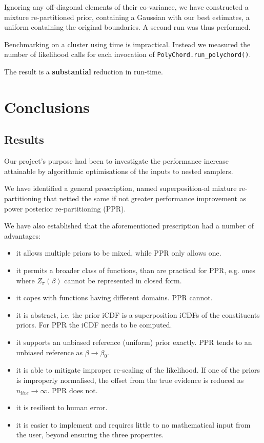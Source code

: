 \documentclass[usenatbib]{mnras}
\begin{document}
Ignoring any off-diagonal elements of their co-variance, we have
constructed a mixture re-partitioned prior, containing a Gaussian
with our best estimates, a uniform containing the original
boundaries. A second run was thus performed.

Benchmarking on a cluster using time is impractical. Instead we
measured the number of likelihood calls for each invocation of
\texttt{PolyChord.run\_polychord()}.

The result is a \textbf{substantial} reduction in run-time. 




\section{Conclusions}
\label{sec:orgaf00819}

\subsection{Results}
\label{sec:org6b6bf5c}
Our project's purpose had been to investigate the performance
increase attainable by algorithmic optimisations of the inputs to
nested samplers. 

We have identified a general prescription, named superposition-al
mixture re-partitioning that netted the same if not greater
performance improvement as power posterior re-partitioning (PPR). 

We have also established that the aforementioned prescription had a
number of advantages:
\begin{itemize}
\item it allows multiple priors to be mixed, while PPR only allows one.
\item it permits a broader class of functions, than are practical for
PPR, e.g. ones where \(Z_{\pi}(\beta)\) cannot be represented in
closed form.
\item it copes with functions having different domains. PPR cannot.
\item it is abstract, i.e. the prior iCDF is a superposition iCDFs of
the constituents priors. For PPR the iCDF needs to be computed.
\item it supports an unbiased reference (uniform) prior exactly. PPR
tends to an unbiased reference as \(\beta\rightarrow\beta_{0}\).
\item it is able to mitigate improper re-scaling of the
likelihood. If one of the priors is improperly normalised, the
offset from the true evidence is reduced as
\(n_{live}\rightarrow\infty\). PPR does not.
\item it is resilient to human error.
\item it is easier to implement and requires little to no mathematical
input from the user, beyond ensuring the three properties.
\end{itemize}
\end{document}
